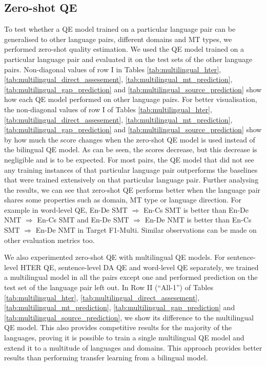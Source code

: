 \subsection{Zero-shot QE}
\label{sec:multilingual_zeroshot}

To test whether a QE model trained on a particular language pair can be generalised to other language pairs, different domains and MT types, we performed zero-shot quality estimation. We used the QE model trained on a particular language pair and evaluated it on the test sets of the other language pairs. Non-diagonal values of row I in Tables  \ref{tab:multilingual_hter}, \ref{tab:multilingual_direct_assesement}, \ref{tab:multilingual_mt_prediction}, \ref{tab:multilingual_gap_prediction} and \ref{tab:multilingual_source_prediction} show how each QE model performed on other language pairs. For better visualisation, the non-diagonal values of row I of Tables   \ref{tab:multilingual_hter}, \ref{tab:multilingual_direct_assesement}, \ref{tab:multilingual_mt_prediction}, \ref{tab:multilingual_gap_prediction} and \ref{tab:multilingual_source_prediction} show by how much the score changes when the zero-shot QE model is used instead of the bilingual QE model. As can be seen, the scores decrease, but this decrease is negligible and is to be expected. For most pairs, the QE model that did not see any training instances of that particular language pair outperforms the baselines that were trained extensively on that particular language pair. Further analysing the results, we can see that zero-shot QE performs better when the language pair shares some properties such as domain, MT type or language direction. For example in word-level QE, En-De SMT $\Rightarrow$ En-Cs SMT is better than En-De NMT $\Rightarrow$ En-Cs SMT and En-De SMT $\Rightarrow$ En-De NMT is better than En-Cs SMT $\Rightarrow$ En-De NMT in Target F1-Multi. Similar observations can be made on other evaluation metrics too. 

We also experimented zero-shot QE with multilingual QE models. For sentence-level HTER QE, sentence-level DA QE and word-level QE separately, we trained a multilingual model in all the pairs except one and performed prediction on the test set of the language pair left out. In Row  II (``All-1'') of Tables \ref{tab:multilingual_hter}, \ref{tab:multilingual_direct_assesement}, \ref{tab:multilingual_mt_prediction}, \ref{tab:multilingual_gap_prediction} and \ref{tab:multilingual_source_prediction}, we show its difference to the multilingual QE model. This also provides competitive results for the majority of the languages, proving it is possible to train a single multilingual QE model and extend it to a multitude of languages and domains. This approach provides better results than performing transfer learning from a bilingual model.

